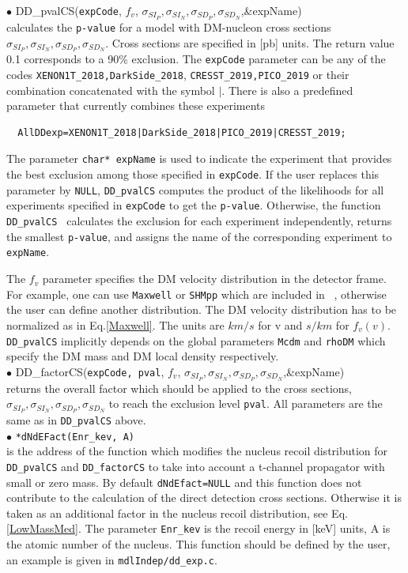 \documentclass[12pt,a4paper]{article}
\begin{document}
\noindent
$\bullet$ DD\_pvalCS(\verb|expCode|, $f_v$, $\sigma_{SI_P},\sigma_{SI_N},\sigma_{SD_P}, \sigma_{SD_N}$,\&expName)\\
calculates the {\tt p-value} for a model with DM-nucleon cross sections 
$\sigma_{SI_P},\sigma_{SI_N},\sigma_{SD_P}, \sigma_{SD_N}$. Cross sections are specified in
[pb] units. The return value 0.1 corresponds to a 90\% exclusion.   
 The {\tt expCode} parameter can be any of the codes  \verb|XENON1T_2018,DarkSide_2018|, \verb|CRESST_2019,PICO_2019| or their combination concatenated with the symbol
$\mid$. There is also a predefined parameter that  currently combines these experiments 
\begin{verbatim}
  AllDDexp=XENON1T_2018|DarkSide_2018|PICO_2019|CRESST_2019;
\end{verbatim}

The parameter {\tt char* expName}  is used to indicate the   experiment that  provides
the best exclusion among those specified in  {\tt expCode}.  If  the user  replaces this parameter by {\tt NULL},  
 {\tt  DD\_pvalCS} computes the  product of the likelihoods for all experiments specified in {\tt expCode} to 
get the {\tt p-value}. Otherwise, the function {\tt DD\_pvalCS } calculates the
exclusion for each experiment  independently, returns the smallest {\tt p-value}, and assigns the 
 name of the corresponding experiment to  {\tt expName}.  

The $f_v$ parameter specifies the DM velocity distribution in the detector frame. For
example, one can use   {\tt Maxwell} or {\tt SHMpp} which are
included in \micro~,   otherwise the user can define another distribution.   
The DM velocity distribution  has to be normalized  as in Eq.\ref{Maxwell}.
 The units  are $km/s$ for v and $s/km$ for  $f_v(v)$. {\tt DD\_pvalCS} implicitly depends on the 
global parameters  {\tt Mcdm}  and  {\tt rhoDM} which specify the DM mass and DM  local density respectively.\\
  
\noindent
$\bullet$ DD\_factorCS(\verb|expCode, pval|, $f_v$, $\sigma_{SI_P},\sigma_{SI_N},\sigma_{SD_P},\sigma_{SD_N}$,\&expName)\\ 
returns the overall factor which should be applied to the cross sections, $\sigma_{SI_P},\sigma_{SI_N},\sigma_{SD_P}, \sigma_{SD_N}$ to reach  the exclusion level {\tt pval}.  
All parameters are the same as in {\tt DD\_pvalCS} above. \\

\noindent
$\bullet$ \verb|*dNdEFact(Enr_kev, A)|\\
is the address of the function which modifies the nucleus recoil distribution  for {\tt DD\_pvalCS}
and {\tt DD\_factorCS}   to take into account a 
t-channel propagator  with  small or zero mass.  By default \verb|dNdEfact=NULL| and this 
function does not contribute to  the calculation of the direct detection cross sections. Otherwise  it is taken as an additional factor 
in the nucleus recoil distribution, see Eq.\ref{LowMassMed}.  
The parameter {\tt Enr\_kev} is the recoil energy in [keV] units, A is the  atomic number of the nucleus. This function should be defined by the user, an example is given in 
\verb|mdlIndep/dd_exp.c|.
\end{document}

